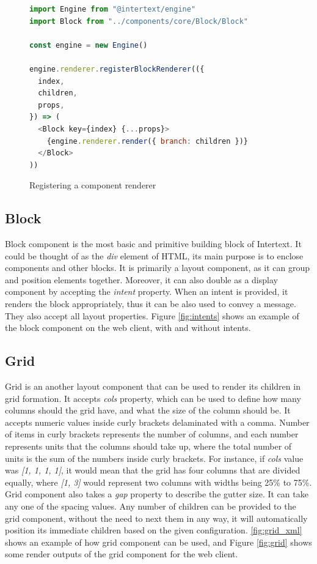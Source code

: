 \begin{figure}
\begin{minipage}{\linewidth}
\begin{lstlisting}[language=javascript]
import Engine from "@intertext/engine"
import Block from "../components/core/Block/Block"

const engine = new Engine()

engine.renderer.registerBlockRenderer(({
  index,
  children,
  props,
}) => (
  <Block key={index} {...props}>
    {engine.renderer.render({ branch: children })}
  </Block>
))
\end{lstlisting}
\end{minipage}
\caption{Registering a component renderer}%
\label{fig:registering_renderer}%
\end{figure}

\subsection{Block}

Block component is the most basic and primitive building block of Intertext. It could be thought of as the \textit{div} element of HTML, its main purpose is to enclose components and other blocks. It is primarily a layout component, as it can group and position elements together. Moreover, it can also double as a display component by accepting the \textit{intent} property. When an intent is provided, it renders the block appropriately, thus it can be also used to convey a message. They also accept all layout properties. Figure \ref{fig:intents} shows an example of the block component on the web client, with and without intents.

\subsection{Grid}

Grid is an another layout component that can be used to render its children in grid formation. It accepts \textit{cols} property, which can be used to define how many columns should the grid have, and what the size of the column should be. It accepts numeric values inside curly brackets delaminated with a comma. Number of items in curly brackets represents the number of columns, and each number represents units that the columns should take up, where the total number of units is the sum of the numbers inside curly brackets. For instance, if \textit{cols} value was \textit{[1, 1, 1, 1]}, it would mean that the grid has four columns that are divided equally, where \textit{[1, 3]} would represent two columns with widths being 25\% to 75\%. Grid component also takes a \textit{gap} property to describe the gutter size. It can take any one of the spacing values. Any number of children can be provided to the grid component, without the need to next them in any way, it will automatically position its immediate children based on the given configuration. \ref{fig:grid_xml} shows an example of how grid component can be used, and Figure \ref{fig:grid} shows some render outputs of the grid component for the web client.

